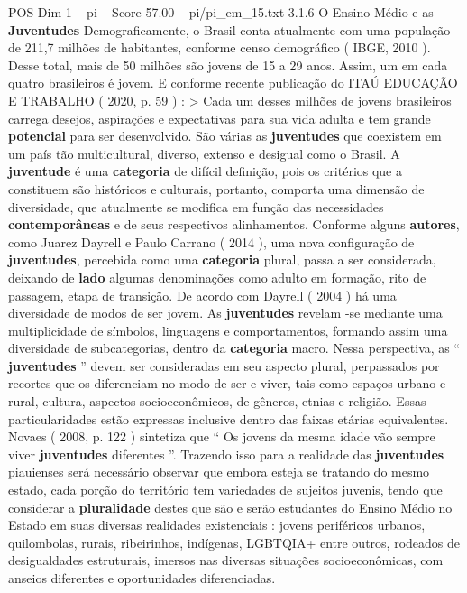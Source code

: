 \begin{textsample}{POS Dim 1 – pi – Score 57.00 – pi/pi\_em\_15.txt}  \label{ex:f1_pos_057}
3.1.6 O Ensino Médio e as \textbf{Juventudes} Demograficamente, o Brasil conta atualmente com uma população de 211,7 milhões de habitantes, conforme censo demográfico ( IBGE, 2010 ).
Desse total, mais de 50 milhões são jovens de 15 a 29 anos.
Assim, um em cada quatro brasileiros é jovem.
E conforme recente publicação do ITAÚ EDUCAÇÃO E TRABALHO ( 2020, p. 59 ) : > Cada um desses milhões de jovens brasileiros carrega desejos, aspirações e expectativas para sua vida adulta e tem grande \textbf{potencial} para ser desenvolvido.
São várias as \textbf{juventudes} que coexistem em um país tão multicultural, diverso, extenso e desigual como o Brasil.
A \textbf{juventude} é uma \textbf{categoria} de difícil definição, pois os critérios que a constituem são históricos e culturais, portanto, comporta uma dimensão de diversidade, que atualmente se modifica em função das necessidades \textbf{contemporâneas} e de seus respectivos alinhamentos.
Conforme alguns \textbf{autores}, como Juarez Dayrell e Paulo Carrano ( 2014 ), uma nova configuração de \textbf{juventudes}, percebida como uma \textbf{categoria} plural, passa a ser considerada, deixando de \textbf{lado} algumas denominações como adulto em formação, rito de passagem, etapa de transição.
De acordo com Dayrell ( 2004 ) há uma diversidade de modos de ser jovem.
As \textbf{juventudes} revelam -se mediante uma multiplicidade de símbolos, linguagens e comportamentos, formando assim uma diversidade de subcategorias, dentro da \textbf{categoria} macro.
Nessa perspectiva, as “ \textbf{juventudes} ” devem ser consideradas em seu aspecto plural, perpassados por recortes que os diferenciam no modo de ser e viver, tais como espaços urbano e rural, cultura, aspectos socioeconômicos, de gêneros, etnias e religião.
Essas particularidades estão expressas inclusive dentro das faixas etárias equivalentes.
Novaes ( 2008, p. 122 ) sintetiza que “ Os jovens da mesma idade vão sempre viver \textbf{juventudes} diferentes ”.
Trazendo isso para a realidade das \textbf{juventudes} piauienses será necessário observar que embora esteja se tratando do mesmo estado, cada porção do território tem variedades de sujeitos juvenis, tendo que considerar a \textbf{pluralidade} destes que são e serão estudantes do Ensino Médio no Estado em suas diversas realidades existenciais : jovens periféricos urbanos, quilombolas, rurais, ribeirinhos, indígenas, LGBTQIA+ entre outros, rodeados de desigualdades estruturais, imersos nas diversas situações socioeconômicas, com anseios diferentes e oportunidades diferenciadas.

\end{textsample}
